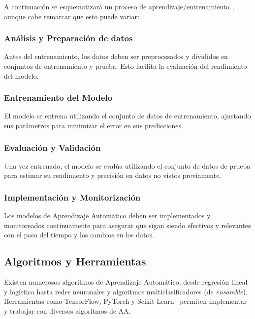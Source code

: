 A continuación se esquematizará un proceso de aprendizaje/entrenamiento~\cite{raschka2019}, aunque cabe remarcar que esto puede variar:

\subsubsection{Análisis y Preparación de datos}
Antes del entrenamiento, los datos deben ser preprocesados y divididos en conjuntos de entrenamiento y prueba. Esto facilita la evaluación del rendimiento del modelo.

\bigskip

\subsubsection{Entrenamiento del Modelo}
El modelo se entrena utilizando el conjunto de datos de entrenamiento, ajustando sus parámetros para minimizar el error en sus predicciones.

\bigskip

\subsubsection{Evaluación y Validación}
Una vez entrenado, el modelo se evalúa utilizando el conjunto de datos de prueba para estimar su rendimiento y precisión en datos no vistos previamente.

\bigskip

\subsubsection{Implementación y Monitorización}
Los modelos de Aprendizaje Automático deben ser implementados y monitoreados continuamente para asegurar que sigan siendo efectivos y relevantes con el paso del tiempo y los cambios en los datos.

\bigskip

\subsection{Algoritmos y Herramientas}

Existen numerosos algoritmos de Aprendizaje Automático, desde regresión lineal y logística hasta redes neuronales y algoritmos multiclasificadores (de \textit{ensamble}). Herramientas como TensorFlow, PyTorch y Scikit-Learn~\cite{raschka2019} permiten implementar y trabajar con diversos algoritmos de AA. 

